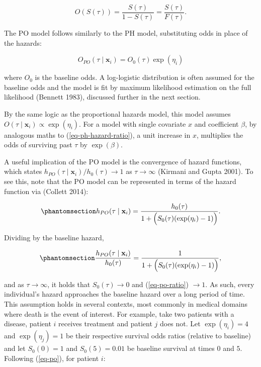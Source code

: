 \documentclass[
  letterpaper,
  krantz2]{style/krantz}
\begin{document}
\[
O(S(\tau)) = \frac{S(\tau)}{1-S(\tau)} = \frac{S(\tau)}{F(\tau)}.
\]

The PO model follows similarly to the PH model, substituting odds in
place of the hazards:

\[
O_{PO}(\tau \mid \mathbf{x}_i) =  O_0(\tau)\exp(\eta_i)
\]

where \(O_0\) is the baseline odds. A log-logistic distribution is often
assumed for the baseline odds and the model is fit by maximum likelihood
estimation on the full likelihood (Bennett 1983), discussed further in
the next section.

By the same logic as the proportional hazards model, this model assumes
\(O(\tau \mid \mathbf{x}_i) \propto \exp(\eta_i)\). For a model with
single covariate \(x\) and coefficient \(\beta\), by analogous maths to
(\ref{eq-ph-hazard-ratio}), a unit increase in \(x\), multiplies the
odds of surviving past \(\tau\) by \(\exp(\beta)\).

A useful implication of the PO model is the convergence of hazard
functions, which states
\(h_{PO}(\tau \mid \mathbf{x}_i)/h_0(\tau) \rightarrow 1\) as
\(\tau \rightarrow \infty\) (Kirmani and Gupta 2001). To see this, note
that the PO model can be represented in terms of the hazard function via
(Collett 2014):

\begin{equation}\phantomsection\label{eq-po}{
h_{PO}(\tau \mid \mathbf{x}_i) =  \frac{h_0(\tau)}{1 + \Big(S_0(\tau)(\exp(\eta_i) - 1)\Big)}.
}\end{equation}

Dividing by the baseline hazard,

\begin{equation}\phantomsection\label{eq-po-ratio}{
\frac{h_{PO}(\tau \mid \mathbf{x}_i)}{h_0(\tau)} = \frac{1}{1 + \Big(S_0(\tau)(\exp(\eta_i) - 1)\Big)},
}\end{equation}

and as \(\tau \rightarrow \infty\), it holds that
\(S_0(\tau) \rightarrow 0\) and (\ref{eq-po-ratio}) \(\rightarrow 1\).
As such, every individual's hazard approaches the baseline hazard over a
long period of time. This assumption holds in several contexts, most
commonly in medical domains where death is the event of interest. For
example, take two patients with a disease, patient \(i\) receives
treatment and patient \(j\) does not. Let \(\exp(\eta_i) = 4\) and
\(\exp(\eta_j) = 1\) be their respective survival odds ratios (relative
to baseline) and let \(S_0(0) = 1\) and \(S_0(5) = 0.01\) be baseline
survival at times \(0\) and \(5\). Following (\ref{eq-po}), for patient
\(i\):
\end{document}
